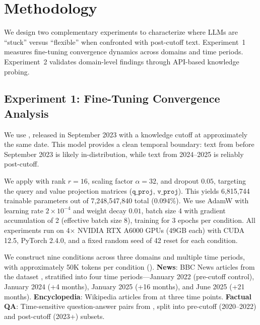 \section{Methodology}
\label{sec:method}

We design two complementary experiments to characterize where LLMs are ``stuck'' versus ``flexible'' when confronted with post-cutoff text. Experiment~1 measures fine-tuning convergence dynamics across domains and time periods. Experiment~2 validates domain-level findings through API-based knowledge probing.

\subsection{Experiment 1: Fine-Tuning Convergence Analysis}
\label{sec:method-finetuning}

 We use \mistral \citep{jiang2023mistral}, released in September 2023 with a knowledge cutoff at approximately the same date. This model provides a clean temporal boundary: text from before September 2023 is likely in-distribution, while text from 2024--2025 is reliably post-cutoff.

 We apply \lora \citep{hu2022lora} with rank $r{=}16$, scaling factor $\alpha{=}32$, and dropout $0.05$, targeting the query and value projection matrices ($\mathtt{q\_proj}$, $\mathtt{v\_proj}$). This yields 6,815,744 trainable parameters out of 7,248,547,840 total (0.094\%). We use AdamW with learning rate $2 \times 10^{-4}$ and weight decay $0.01$, batch size 4 with gradient accumulation of 2 (effective batch size 8), training for 3 epochs per condition. All experiments run on 4$\times$ NVIDIA RTX A6000 GPUs (49GB each) with CUDA 12.5, PyTorch 2.4.0, and a fixed random seed of 42 reset for each condition.

 We construct nine conditions across three domains and multiple time periods, with approximately 50K tokens per condition (). \textbf{News}: BBC News articles from the \bbcnews dataset \citep{li2024outdated}, stratified into four time periods---January 2022 (pre-cutoff control), January 2024 (+4 months), January 2025 (+16 months), and June 2025 (+21 months). \textbf{Encyclopedia}: Wikipedia articles from \wikitext \citep{li2024outdated} at three time points. \textbf{Factual QA}: Time-sensitive question-answer pairs from \taqa \citep{zhao2024set}, split into pre-cutoff (2020--2022) and post-cutoff (2023+) subsets.

